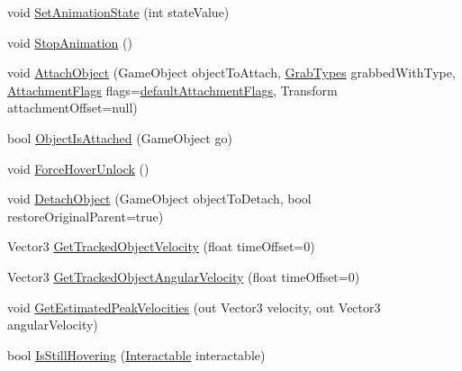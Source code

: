 \begin{DoxyCompactItemize}
\item 
void \mbox{\hyperlink{class_valve_1_1_v_r_1_1_interaction_system_1_1_hand_a509648d84a26947d728100b95e8b466a}{Set\+Animation\+State}} (int state\+Value)
\item 
void \mbox{\hyperlink{class_valve_1_1_v_r_1_1_interaction_system_1_1_hand_a8eb9659e16a599eefc256c596b30fcb7}{Stop\+Animation}} ()
\item 
void \mbox{\hyperlink{class_valve_1_1_v_r_1_1_interaction_system_1_1_hand_a73b0ea1d5b037fca1b7cb453061d98d6}{Attach\+Object}} (Game\+Object object\+To\+Attach, \mbox{\hyperlink{namespace_valve_1_1_v_r_1_1_interaction_system_ae03ab84d315f5997fd000817bfb96a0f}{Grab\+Types}} grabbed\+With\+Type, \mbox{\hyperlink{class_valve_1_1_v_r_1_1_interaction_system_1_1_hand_a61701f82b8f3fac8818954ec71804cb5}{Attachment\+Flags}} flags=\mbox{\hyperlink{class_valve_1_1_v_r_1_1_interaction_system_1_1_hand_a836a6cb55d2514dbed680981dfcc5505}{default\+Attachment\+Flags}}, Transform attachment\+Offset=null)
\item 
bool \mbox{\hyperlink{class_valve_1_1_v_r_1_1_interaction_system_1_1_hand_adef8b762b3b3a6e997bfd6e33b39f6fe}{Object\+Is\+Attached}} (Game\+Object go)
\item 
void \mbox{\hyperlink{class_valve_1_1_v_r_1_1_interaction_system_1_1_hand_a93b111e767435715745cb1dda7817b0c}{Force\+Hover\+Unlock}} ()
\item 
void \mbox{\hyperlink{class_valve_1_1_v_r_1_1_interaction_system_1_1_hand_ab0bccf232d1291c6c3000d9a967635ca}{Detach\+Object}} (Game\+Object object\+To\+Detach, bool restore\+Original\+Parent=true)
\item 
Vector3 \mbox{\hyperlink{class_valve_1_1_v_r_1_1_interaction_system_1_1_hand_a128de24fb785ca4bfdb3e5516e20573e}{Get\+Tracked\+Object\+Velocity}} (float time\+Offset=0)
\item 
Vector3 \mbox{\hyperlink{class_valve_1_1_v_r_1_1_interaction_system_1_1_hand_a5b524967844a7d090649d90eb82aafe7}{Get\+Tracked\+Object\+Angular\+Velocity}} (float time\+Offset=0)
\item 
void \mbox{\hyperlink{class_valve_1_1_v_r_1_1_interaction_system_1_1_hand_a0fa717c485c85536493e1da9239ceed7}{Get\+Estimated\+Peak\+Velocities}} (out Vector3 velocity, out Vector3 angular\+Velocity)
\item 
bool \mbox{\hyperlink{class_valve_1_1_v_r_1_1_interaction_system_1_1_hand_a8938a296cb903758925e20b7a314f7e5}{Is\+Still\+Hovering}} (\mbox{\hyperlink{class_valve_1_1_v_r_1_1_interaction_system_1_1_interactable}{Interactable}} interactable)

\end{DoxyCompactItemize}

